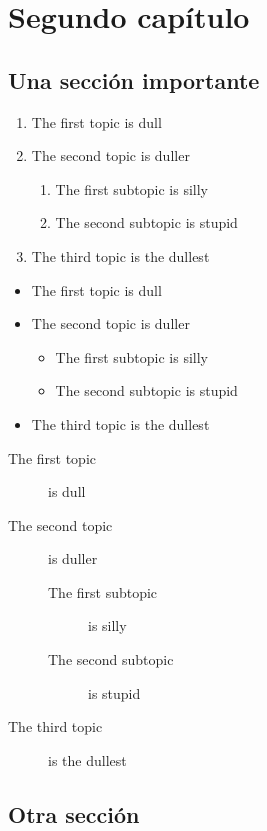 
\chapter{Segundo capítulo}

\section{Una sección importante}

\begin{enumerate}
	\item The first topic is dull
	\item The second topic is duller
	\begin{enumerate}
		\item The first subtopic is silly
		\item The second subtopic is stupid
	\end{enumerate}
	\item The third topic is the dullest
\end{enumerate}
\begin{itemize}
	\item The first topic is dull
	\item The second topic is duller
	\begin{itemize}
		\item The first subtopic is silly
		\item The second subtopic is stupid
	\end{itemize}
	\item The third topic is the dullest
\end{itemize}

\begin{description}
\item[The first topic] is dull
\item[The second topic] is duller
\begin{description}
\item[The first subtopic] is silly
\item[The second subtopic] is stupid
\end{description}
\item[The third topic] is the dullest
\end{description}

\section{Otra sección} \label{sec:otra_seccion}


